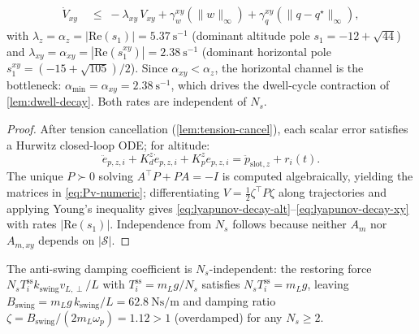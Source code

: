 \begin{lemma}
\begin{align}
  \label{eq:lyapunov-decay-alt}\\
  \dot V_{xy} &\;\le\; -\lambda_{xy}\,V_{xy}
    + \gamma_w^{xy}(\|w\|_\infty) + \gamma_q^{xy}(\|q - q^\star\|_\infty),
  \label{eq:lyapunov-decay-xy}
\end{align}
with $\lambda_z = \alpha_z = |\mathrm{Re}(s_1)| =
\SI{5.37}{\second^{-1}}$ (dominant altitude pole
$s_1 = -12+\sqrt{44}$) and $\lambda_{xy} = \alpha_{xy} =
|\mathrm{Re}(s_1^{xy})| = \SI{2.38}{\second^{-1}}$ (dominant
horizontal pole $s_1^{xy} = (-15+\sqrt{105})/2$). Since
$\alpha_{xy} < \alpha_z$, the horizontal channel is the
bottleneck: $\alpha_{\min} = \alpha_{xy} =
\SI{2.38}{\second^{-1}}$, which drives the dwell-cycle
contraction of \cref{lem:dwell-decay}. Both rates are
independent of $N_s$.
\end{lemma}

\begin{proof}
After tension cancellation (\cref{lem:tension-cancel}), each scalar error satisfies a Hurwitz closed-loop ODE; for altitude:
\begin{equation}
  \ddot{e}_{p,z,i} + K_d^z \dot{e}_{p,z,i} + K_p^z e_{p,z,i}
    = \ddot{p}_{\mathrm{slot},z} + r_i(t).
  \label{eq:alt-error-ode}
\end{equation}
The unique $P \succ 0$ solving $A^\top P + PA = -I$ is computed algebraically, yielding the matrices in \eqref{eq:Pv-numeric}; differentiating $V = \tfrac{1}{2}\zeta^\top P\zeta$ along trajectories and applying Young's inequality gives \eqref{eq:lyapunov-decay-alt}--\eqref{eq:lyapunov-decay-xy} with rates $|\mathrm{Re}(s_1)|$. Independence from $N_s$ follows because neither $A_m$ nor $A_{m,xy}$ depends on $|\mathcal{S}|$.
\end{proof}

\begin{remark}
\label{lem:antiswing-invariant}
The anti-swing damping coefficient is $N_s$-independent: the
restoring force $N_s T_i^{\mathrm{ss}} k_{\mathrm{swing}}
v_{L,\perp}/L$ with $T_i^{\mathrm{ss}} = m_L g/N_s$ satisfies
$N_s T_i^{\mathrm{ss}} = m_L g$, leaving $B_{\mathrm{swing}} =
m_L g\,k_{\mathrm{swing}}/L = \SI{62.8}{\newton\second\per\metre}$
and damping ratio $\zeta = B_{\mathrm{swing}}/(2m_L\omega_p)
= 1.12 > 1$ (overdamped) for any $N_s \ge 2$.
\end{remark}

